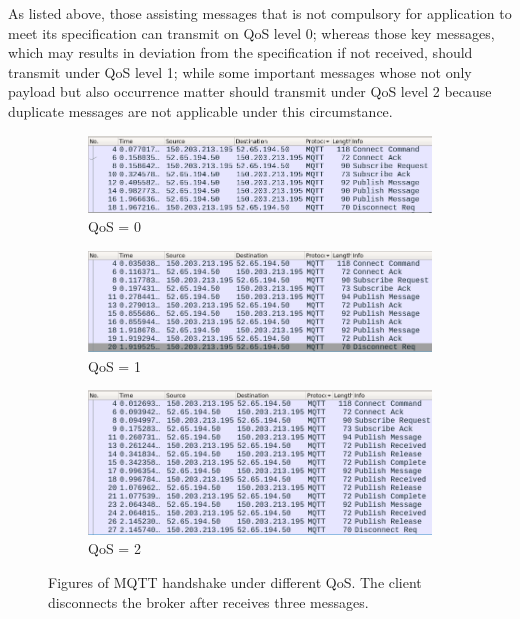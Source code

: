 \documentclass[12pt, letterpaper]{article}
\begin{document}
As listed above, those assisting messages that is not compulsory for application to meet its specification can transmit on QoS level 0; whereas those key messages, which may results in deviation from the specification if not received, should transmit under QoS level 1; while some important messages whose not only payload but also occurrence matter should transmit under QoS level 2 because duplicate messages are not applicable under this circumstance.

\begin{figure}
	\centering
	\begin{subfigure}[t]{0.77\textwidth}
		\centering
		\includegraphics[width=\textwidth]{wire_shark/handshake-q0}
		\caption{QoS = 0}
	\end{subfigure}
	
	\begin{subfigure}[t]{0.77\textwidth}
		\centering
		\includegraphics[width=\textwidth]{wire_shark/handshake-q1}
		\caption{QoS = 1}
	\end{subfigure}
	
	\begin{subfigure}[t]{0.77\textwidth}
		\centering
		\includegraphics[width=\textwidth]{wire_shark/handshake-q2}
		\caption{QoS = 2}
	\end{subfigure}

	\caption{Figures of MQTT handshake under different QoS. The client disconnects the broker after receives three messages.}
	\label{fig:handshake_snap_shot}
\end{figure}
\end{document}
